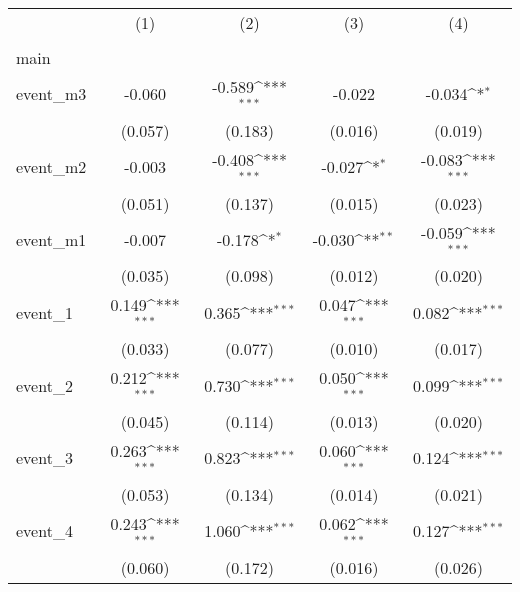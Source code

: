 {
\def\sym#1{\ifmmode^{#1}\else\(^{#1}\)\fi}
\begin{tabular}{l*{4}{c}}
\hline\hline
                    &\multicolumn{1}{c}{(1)}&\multicolumn{1}{c}{(2)}&\multicolumn{1}{c}{(3)}&\multicolumn{1}{c}{(4)}\\
                    &\multicolumn{1}{c}{} &\multicolumn{1}{c}{} &\multicolumn{1}{c}{} &\multicolumn{1}{c}{} \\
\hline
main                &                     &                     &                     &                     \\
event\_m3            &      -0.060         &      -0.589\sym{***}&      -0.022         &      -0.034\sym{*}  \\
                    &     (0.057)         &     (0.183)         &     (0.016)         &     (0.019)         \\
[1em]
event\_m2            &      -0.003         &      -0.408\sym{***}&      -0.027\sym{*}  &      -0.083\sym{***}\\
                    &     (0.051)         &     (0.137)         &     (0.015)         &     (0.023)         \\
[1em]
event\_m1            &      -0.007         &      -0.178\sym{*}  &      -0.030\sym{**} &      -0.059\sym{***}\\
                    &     (0.035)         &     (0.098)         &     (0.012)         &     (0.020)         \\
[1em]
event\_1             &       0.149\sym{***}&       0.365\sym{***}&       0.047\sym{***}&       0.082\sym{***}\\
                    &     (0.033)         &     (0.077)         &     (0.010)         &     (0.017)         \\
[1em]
event\_2             &       0.212\sym{***}&       0.730\sym{***}&       0.050\sym{***}&       0.099\sym{***}\\
                    &     (0.045)         &     (0.114)         &     (0.013)         &     (0.020)         \\
[1em]
event\_3             &       0.263\sym{***}&       0.823\sym{***}&       0.060\sym{***}&       0.124\sym{***}\\
                    &     (0.053)         &     (0.134)         &     (0.014)         &     (0.021)         \\
[1em]
event\_4             &       0.243\sym{***}&       1.060\sym{***}&       0.062\sym{***}&       0.127\sym{***}\\
                    &     (0.060)         &     (0.172)         &     (0.016)         &     (0.026)         \\

\end{tabular}}
